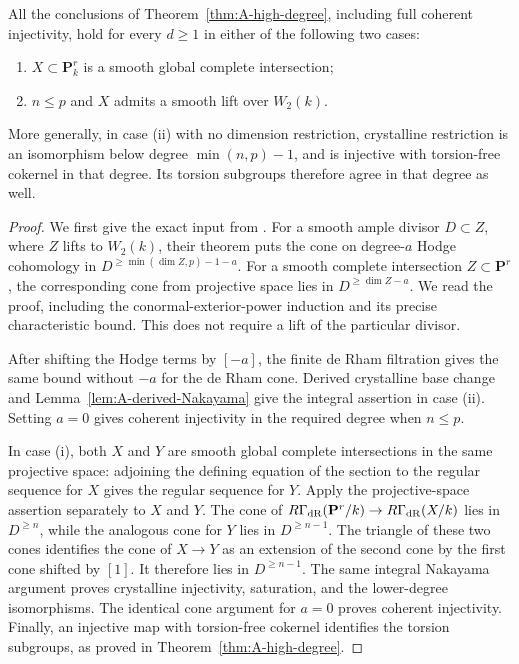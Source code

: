 \begin{theorem}
\label{thm:A-all-degree-ranges}
All the conclusions of Theorem~\ref{thm:A-high-degree}, including
full coherent injectivity, hold for every $d\geq1$ in either of the
following two cases:
\begin{enumerate}[label=(\roman*)]
\item $X\subset\mathbf P^r_k$ is a smooth global complete intersection;
\item $n\leq p$ and $X$ admits a smooth lift over $W_2(k)$.
\end{enumerate}
More generally, in case (ii) with no dimension restriction, crystalline
restriction is an isomorphism below degree $\min(n,p)-1$, and is
injective with torsion-free cokernel in that degree.  Its torsion
subgroups therefore agree in that degree as well.
\end{theorem}
\begin{proof}
We first give the exact input from \citet[Definition 2.2.1 and
Theorem 2.2.3]{CotnerZavyalov2024}.  For a smooth ample divisor
$D\subset Z$, where $Z$ lifts to $W_2(k)$, their theorem puts the
cone on degree-$a$ Hodge cohomology in
$D^{\geq\min(\dim Z,p)-1-a}$.  For a smooth complete intersection
$Z\subset\mathbf P^r$, the corresponding cone from projective
space lies in $D^{\geq\dim Z-a}$.  We read the proof, including the
conormal-exterior-power induction and its precise characteristic
bound.  This does not require a lift of the particular divisor.

After shifting the Hodge terms by $[-a]$, the finite de Rham
filtration gives the same bound without $-a$ for the de Rham cone.
Derived crystalline base change and
Lemma~\ref{lem:A-derived-Nakayama} give the integral assertion in
case (ii).  Setting $a=0$ gives coherent injectivity in the required
degree when $n\leq p$.

In case (i), both $X$ and $Y$ are smooth global complete
intersections in the same projective space: adjoining the defining
equation of the section to the regular sequence for $X$ gives the
regular sequence for $Y$.  Apply the projective-space assertion
separately to $X$ and $Y$.  The cone of
$R\Gamma_{\mathrm{dR}}(\mathbf P^r/k)\to R\Gamma_{\mathrm{dR}}(X/k)$ lies in
$D^{\geq n}$, while the analogous cone for $Y$ lies in
$D^{\geq n-1}$.  The triangle of these two cones identifies the
cone of $X\to Y$ as an extension of the second cone by the first
cone shifted by $[1]$.  It therefore lies in $D^{\geq n-1}$.
The same integral Nakayama argument proves crystalline injectivity,
saturation, and the lower-degree isomorphisms.  The identical
cone argument for $a=0$ proves coherent injectivity.  Finally,
an injective map with torsion-free cokernel identifies the torsion
subgroups, as proved in Theorem~\ref{thm:A-high-degree}.
\end{proof}

